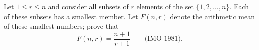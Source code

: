 Let $1 \leq r \leq n$ and consider all subsets of $r$ elements of the set $\{1, 2, \ldots, n\}$. Each of these subsets has a smallest member. Let $F(n, r)$ denote the arithmetic mean of these smallest numbers; prove that
\[ F(n, r) = \frac{n + 1}{r + 1} \qquad \text{(IMO 1981).} \]
